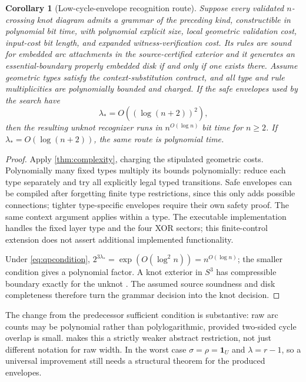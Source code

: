 \documentclass[11pt,a4paper]{article}
\newtheorem{corollary}[theorem]{Corollary}
\theoremstyle{definition}
\theoremstyle{remark}
\newcommand{\one}{\mathbf 1}
\begin{document}
\begin{corollary}[Low-cycle-envelope recognition route]\label{cor:qp}
Suppose every validated $n$-crossing knot diagram admits a grammar of the preceding kind,
constructible in polynomial bit time, with polynomial explicit size, local geometric
validation cost, input-cost bit length, and expanded witness-verification cost.
Its rules are sound for embedded arc attachments in the source-certified exterior and
it generates an essential-boundary properly embedded disk if and only if one exists there.
Assume geometric types satisfy the context-substitution contract, and all type and rule
multiplicities are polynomially bounded and charged. If the safe envelopes used by the
search have
\begin{equation}
                         \lambda_*=O((\log(n+2))^2),
 \label{eq:qpcondition}
\end{equation}
then the resulting unknot recognizer runs in $n^{O(\log n)}$ bit time for $n\ge2$.
If $\lambda_*=O(\log(n+2))$, the same route is polynomial time.
\end{corollary}
\begin{proof}
Apply \cref{thm:complexity}, charging the stipulated geometric costs. Polynomially many
fixed types multiply its bounds polynomially: reduce each type separately and try all
explicitly legal typed transitions. Safe envelopes can be compiled after forgetting
finite type restrictions, since this only adds possible connections; tighter type-specific
envelopes require their own safety proof. The same context argument applies within a type.
The executable implementation handles the fixed layer type and the four XOR sectors;
this finite-control extension does not assert additional implemented functionality.

Under \eqref{eq:qpcondition}, $2^{3\lambda_*}=\exp(O(\log^2 n))=n^{O(\log n)}$;
the smaller condition gives a polynomial factor. A knot exterior in $S^3$ has compressible
boundary exactly for the unknot \cite{lackenby}. The assumed source soundness and disk
completeness therefore turn the grammar decision into the knot decision.
\end{proof}

The change from the predecessor sufficient condition is substantive: raw arc counts may
be polynomial rather than polylogarithmic, provided two-sided cycle overlap is small.
 makes this a strictly weaker abstract restriction, not just different
notation for raw width. In the worst case $\sigma=\rho=\one_U$ and $\lambda=r-1$,
so a universal improvement still needs a structural theorem for the produced envelopes.
\end{document}
